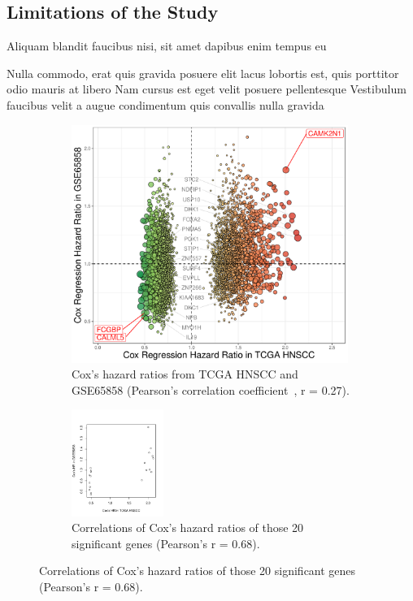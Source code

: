 \documentclass[
paper=landscape,
paper=160mm:90mm, %
fontsize=11pt, %
pagesize, %
parskip=half-, %
]{scrartcl} %
\theoremstyle{mythmstyle} %
\begin{document}
\clearpage

\subsection{Limitations of the Study}


\begin{outline}

\1 Aliquam blandit faucibus nisi, sit amet dapibus enim tempus eu

\2 Nulla commodo, erat quis gravida posuere
\1 elit lacus lobortis est, quis porttitor odio mauris at libero
\1 Nam cursus est eget velit posuere pellentesque
\1 Vestibulum faucibus velit a augue condimentum quis convallis nulla gravida

\end{outline}
\begin{figure}[H]
\widefigure
    
    \begin{subfigure}[a]{0.5\textwidth}
    \includegraphics[width=9cm]{RplotH2H_TCGA_GSE65858_CoxHR.pdf}
    \caption{Cox's hazard ratios from TCGA HNSCC and GSE65858 (Pearson's correlation coefficient~\cite{Schober2018}, r = 0.27).}
    \end{subfigure}
    \begin{subfigure}[b]{0.2\textwidth}
    \includegraphics[width=3cm]{Rplot20_correlation_TCGA_GSE65858_CoxHR.pdf}
    \caption{Correlations of Cox's hazard ratios of those 20 significant genes (Pearson's r = 0.68).}
    \end{subfigure}    
    

\end{figure}
\end{document}
